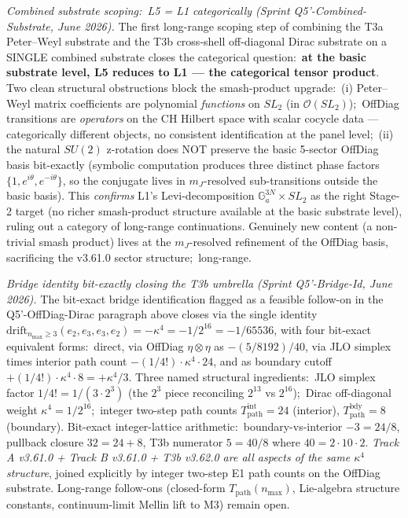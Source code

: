 \documentclass[11pt,a4paper]{article}
\theoremstyle{plain}
\theoremstyle{definition}
\begin{document}
\emph{Combined substrate scoping:\ L5 = L1 categorically (Sprint
Q5'-Combined-Substrate, June 2026).}  The first
long-range scoping step of combining the T3a Peter--Weyl substrate and
the T3b cross-shell off-diagonal Dirac substrate on a SINGLE combined
substrate closes the categorical question:\ \textbf{at the basic
substrate level, L5 reduces to L1 --- the categorical tensor product}.
Two clean structural obstructions block the smash-product upgrade:\
(i) Peter--Weyl matrix coefficients are polynomial \emph{functions} on
$SL_2$ (in $\mathcal{O}(SL_2)$);\ OffDiag transitions are
\emph{operators} on the CH Hilbert space with scalar cocycle data ---
categorically different objects, no consistent identification at the
panel level;\ (ii) the natural $SU(2)$ z-rotation does NOT preserve the
basic 5-sector OffDiag basis bit-exactly (symbolic computation produces
three distinct phase factors $\{1, e^{i\theta}, e^{-i\theta}\}$, so the
conjugate lives in $m_J$-resolved sub-transitions outside the basic
basis).  This \emph{confirms} L1's Levi-decomposition
$\mathbb{G}_a^{3 N} \times SL_2$ as the right Stage-2 target (no
richer smash-product structure available at the basic substrate
level), ruling out a category of long-range continuations.  Genuinely
new content (a non-trivial smash product) lives at the $m_J$-resolved
refinement of the OffDiag basis, sacrificing the v3.61.0 sector
structure;\ long-range.

\emph{Bridge identity bit-exactly closing the T3b umbrella (Sprint
Q5'-Bridge-Id, June 2026).}  The bit-exact
bridge identification flagged as a feasible follow-on in the
Q5'-OffDiag-Dirac paragraph above closes via the single identity
$\mathrm{drift}_{n_{\max} \ge 3}(e_2, e_3, e_3, e_2) = -\kappa^4
= -1/2^{16} = -1/65536$, with four bit-exact equivalent forms:\ direct,
via OffDiag $\eta \otimes \eta$ as $-(5/8192)/40$, via JLO simplex
times interior path count $-(1/4!) \cdot \kappa^4 \cdot 24$, and as
boundary cutoff $+(1/4!) \cdot \kappa^4 \cdot 8 = +\kappa^4/3$.  Three
named structural ingredients:\ JLO simplex factor $1/4! = 1/(3 \cdot 2^3)$
(the $2^3$ piece reconciling $2^{13}$ vs $2^{16}$);\ Dirac off-diagonal
weight $\kappa^4 = 1/2^{16}$;\ integer two-step path counts
$T_{\mathrm{path}}^{\mathrm{int}} = 24$ (interior),
$T_{\mathrm{path}}^{\mathrm{bdy}} = 8$ (boundary).  Bit-exact
integer-lattice arithmetic:\ boundary-vs-interior $-3 = 24/8$, pullback
closure $32 = 24 + 8$, T3b numerator $5 = 40/8$ where
$40 = 2 \cdot 10 \cdot 2$.  \emph{Track A v3.61.0 + Track B v3.61.0 +
T3b v3.62.0 are all aspects of the same $\kappa^4$ structure}, joined
explicitly by integer two-step E1 path counts on the OffDiag substrate.
Long-range follow-ons (closed-form $T_{\mathrm{path}}(n_{\max})$,
Lie-algebra structure constants, continuum-limit Mellin lift to M3)
remain open.
\end{document}
